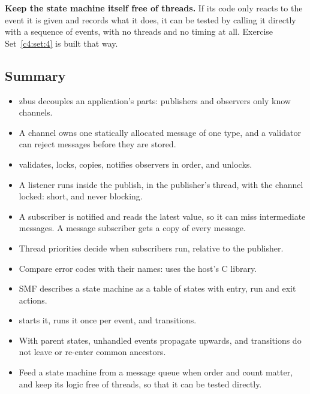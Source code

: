 \textbf{Keep the state machine itself free of threads.} If its code only reacts to the event it is
given and records what it does, it can be tested by calling it directly with a sequence of events,
with no threads and no timing at all. Exercise Set~\ref{c4:set:4} is built that way.

\subsection{Summary}
\begin{itemize}
  \item zbus decouples an application’s parts: publishers and observers only know channels.
  \item A channel owns one statically allocated message of one type, and a validator can reject messages
    before they are stored.
  \item {} validates, locks, copies, notifies observers in order, and unlocks.
  \item A listener runs inside the publish, in the publisher’s thread, with the channel locked: short, and
    never blocking.
  \item A subscriber is notified and reads the latest value, so it can miss intermediate messages. A message
    subscriber gets a copy of every message.
  \item Thread priorities decide when subscribers run, relative to the publisher.
  \item Compare error codes with their names:  uses the host’s C library.
  \item SMF describes a state machine as a table of states with entry, run and exit actions.
  \item {} starts it,  runs it once per event, and
     transitions.
  \item With parent states, unhandled events propagate upwards, and transitions do not leave or re-enter
    common ancestors.
  \item Feed a state machine from a message queue when order and count matter, and keep its logic free of
    threads, so that it can be tested directly.
\end{itemize}
